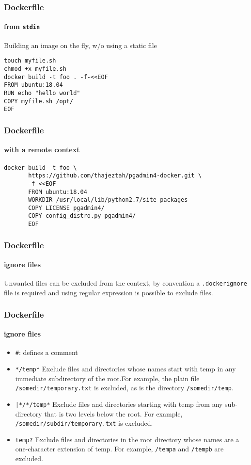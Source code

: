
\begin{frame}[fragile]
\frametitle{Dockerfile}
\framesubtitle{from \lstinline!stdin!}

Building an image on the fly, w/o using a static file

\begin{lstlisting}
touch myfile.sh
chmod +x myfile.sh
docker build -t foo . -f-<<EOF
FROM ubuntu:18.04
RUN echo "hello world"
COPY myfile.sh /opt/
EOF
\end{lstlisting}
\end{frame}


\begin{frame}[fragile]
\frametitle{Dockerfile}
\framesubtitle{with a remote context}

\begin{lstlisting}
docker build -t foo \
       https://github.com/thajeztah/pgadmin4-docker.git \
	   -f-<<EOF
	   FROM ubuntu:18.04
	   WORKDIR /usr/local/lib/python2.7/site-packages
	   COPY LICENSE pgadmin4/
	   COPY config_distro.py pgadmin4/
	   EOF
\end{lstlisting}
\end{frame}

\begin{frame}[fragile]
\frametitle{Dockerfile}
\framesubtitle{ignore files}

Unwanted files can be excluded from the context, by convention
a \lstinline!.dockerignore! file is required and using regular expression
is possible to exclude files.
\end{frame}

\begin{frame}[fragile]
\frametitle{Dockerfile}
\framesubtitle{ignore files}

\begin{itemize}
\item \lstinline!#!: defines a comment
\item \lstinline!*/temp*! Exclude files and directories whose names start with temp in any immediate subdirectory of the root.For example, the plain file \lstinline!/somedir/temporary.txt! is excluded, as is the directory \lstinline!/somedir/temp!.
\item \lstinline!|*/*/temp*! Exclude files and directories starting with temp from any sub-directory that is two levels below the root. For example, \lstinline!/somedir/subdir/temporary.txt! is excluded.
\item \lstinline!temp?! Exclude files and directories in the root directory whose names are a one-character extension of temp. For example, \lstinline!/tempa! and \lstinline!/tempb! are excluded.
\end{itemize}
\end{frame}

